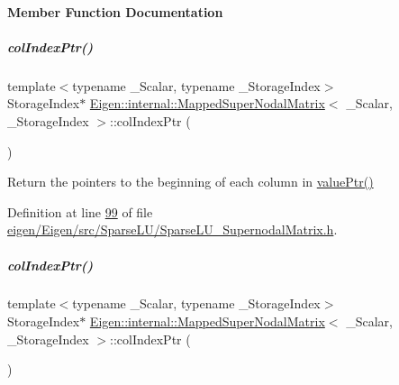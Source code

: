 \paragraph{Member Function Documentation}
\mbox{\label{group___sparse_l_u___module_a87c0272aedd8ee01d4245bd719738b5d}} 
\subparagraph{\texorpdfstring{col\+Index\+Ptr()}{colIndexPtr()}\hspace{0.1cm}{\footnotesize\ttfamily [1/2]}}
{\footnotesize\ttfamily template$<$typename \+\_\+\+Scalar, typename \+\_\+\+Storage\+Index$>$ \\
Storage\+Index$\ast$ \hyperlink{group___sparse_l_u___module_class_eigen_1_1internal_1_1_mapped_super_nodal_matrix}{Eigen\+::internal\+::\+Mapped\+Super\+Nodal\+Matrix}$<$ \+\_\+\+Scalar, \+\_\+\+Storage\+Index $>$\+::col\+Index\+Ptr (\begin{DoxyParamCaption}{ }\end{DoxyParamCaption})\hspace{0.3cm}{\ttfamily [inline]}}

Return the pointers to the beginning of each column in \hyperlink{group___sparse_l_u___module_a6e9ce7d448b76811802d11baf3da97d3}{value\+Ptr()} 

Definition at line \hyperlink{eigen_2_eigen_2src_2_sparse_l_u_2_sparse_l_u___supernodal_matrix_8h_source_l00099}{99} of file \hyperlink{eigen_2_eigen_2src_2_sparse_l_u_2_sparse_l_u___supernodal_matrix_8h_source}{eigen/\+Eigen/src/\+Sparse\+L\+U/\+Sparse\+L\+U\+\_\+\+Supernodal\+Matrix.\+h}.

\mbox{\label{group___sparse_l_u___module_a87c0272aedd8ee01d4245bd719738b5d}} 
\subparagraph{\texorpdfstring{col\+Index\+Ptr()}{colIndexPtr()}\hspace{0.1cm}{\footnotesize\ttfamily [2/2]}}
{\footnotesize\ttfamily template$<$typename \+\_\+\+Scalar, typename \+\_\+\+Storage\+Index$>$ \\
Storage\+Index$\ast$ \hyperlink{group___sparse_l_u___module_class_eigen_1_1internal_1_1_mapped_super_nodal_matrix}{Eigen\+::internal\+::\+Mapped\+Super\+Nodal\+Matrix}$<$ \+\_\+\+Scalar, \+\_\+\+Storage\+Index $>$\+::col\+Index\+Ptr (\begin{DoxyParamCaption}{ }\end{DoxyParamCaption})\hspace{0.3cm}{\ttfamily [inline]}}

